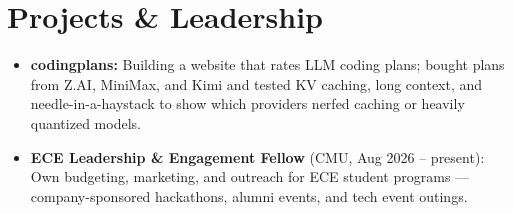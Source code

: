 \documentclass[11pt, letterpaper]{article}
\begin{document}
\section{Projects \& Leadership}
\begin{itemize}
  \item \textbf{codingplans:} Building a website that rates LLM coding plans; bought plans from Z.AI, MiniMax, and Kimi and tested KV caching, long context, and needle-in-a-haystack to show which providers nerfed caching or heavily quantized models.
  \item \textbf{ECE Leadership \& Engagement Fellow} (CMU, Aug 2026 -- present): Own budgeting, marketing, and outreach for ECE student programs --- company-sponsored hackathons, alumni events, and tech event outings.
\end{itemize}
\end{document}

